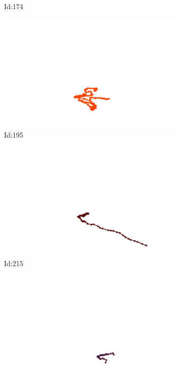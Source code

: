 \documentclass[12pt,twoside]{report}
\begin{document}
\begin{figure}
\begin{subfigure}[b]{0.20\textwidth}
\caption{Id:174}
\end{subfigure}
\begin{subfigure}[b]{0.20\textwidth}
\centering
\includegraphics[width=\textwidth]{../trajectories/195.png}
\caption{Id:195}
\end{subfigure}
\begin{subfigure}[b]{0.20\textwidth}
\centering
\includegraphics[width=\textwidth]{../trajectories/215.png}
\caption{Id:215}
\end{subfigure}
\begin{subfigure}[b]{0.20\textwidth}
\centering
\includegraphics[width=\textwidth]{../trajectories/442.png}

\end{subfigure}
\end{figure}
\end{document}
